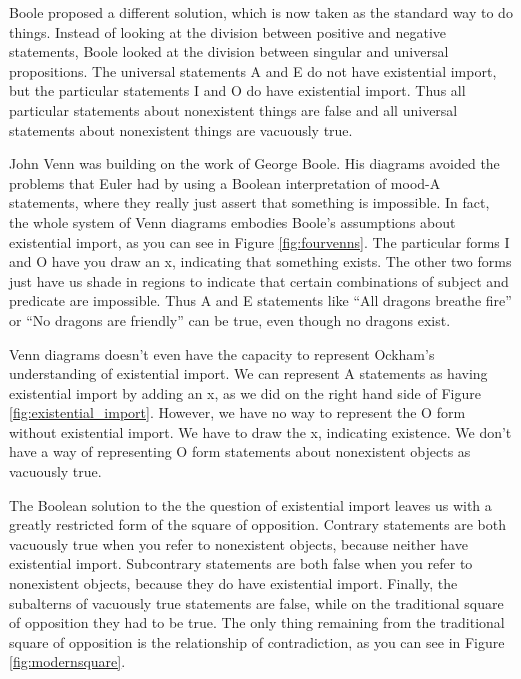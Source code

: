 Boole proposed a different solution, which is now taken as the standard way to do things. Instead of looking at the division between positive and negative statements, Boole looked at the division between singular and universal propositions. The universal statements A and E do not have existential import, but the particular statements I and O do have existential import. Thus all particular statements about nonexistent things are false and all universal statements about nonexistent things are vacuously true. 

John Venn was building on the work of George Boole. His diagrams avoided the problems that Euler had by using a Boolean interpretation of mood-A statements, where they really just assert that something is impossible. In fact, the whole system of Venn diagrams embodies Boole's assumptions about existential import, as you can see in Figure \ref{fig:fourvenns}. The particular forms I and O have you draw an x, indicating that something exists. The other two forms just have us shade in regions to indicate that certain combinations of subject and predicate are impossible. Thus A and E statements like ``All dragons breathe fire'' or ``No dragons are friendly'' can be true, even though no dragons exist. 

Venn diagrams doesn't even have the capacity to represent Ockham's understanding of existential import. We can represent A statements as having existential import by adding an x, as we did on the right hand side of Figure \ref{fig:existential_import}. However, we have no way to represent the O form without existential import. We have to draw the x, indicating existence. We don't have a way of representing O form statements about nonexistent objects as vacuously true. 

The Boolean solution to the the question of existential import leaves us with a greatly restricted form of the square of opposition. Contrary statements are both vacuously true when you refer to nonexistent objects, because neither have existential import. Subcontrary statements are both false when you refer to nonexistent objects, because they do have existential import. Finally, the subalterns of vacuously true statements are false, while on the traditional square of opposition they had to be true. The only thing remaining from the traditional square of opposition is the relationship of contradiction, as you can see in Figure \ref{fig:modernsquare}.

